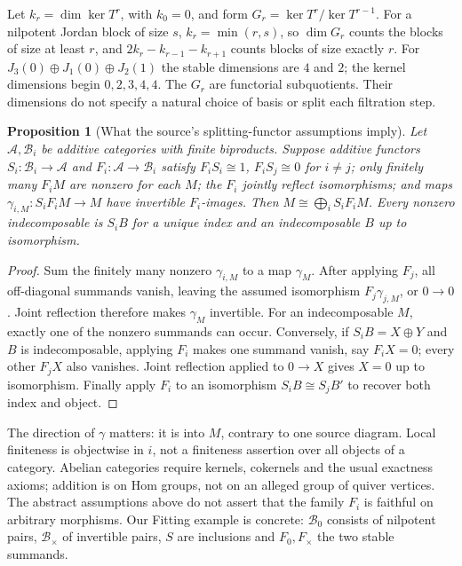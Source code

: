 \documentclass[11pt]{article}
\newtheorem{proposition}[theorem]{Proposition}
\theoremstyle{definition}\newtheorem{definition}[theorem]{Definition}
\theoremstyle{remark}\newtheorem{remark}[theorem]{Remark}
\begin{document}
Let $k_r=\dim\ker T^r$, with $k_0=0$, and form
$G_r=\ker T^r/\ker T^{r-1}$. For a nilpotent Jordan block of size $s$,
$k_r=\min(r,s)$, so $\dim G_r$ counts the blocks of size at least $r$,
and $2k_r-k_{r-1}-k_{r+1}$ counts blocks of size exactly $r$.
For $J_3(0)\oplus J_1(0)\oplus J_2(1)$ the stable dimensions are
$4$ and $2$; the kernel dimensions begin $0,2,3,4,4$.
The $G_r$ are functorial subquotients. Their dimensions do not specify a
natural choice of basis or split each filtration step.

\begin{proposition}[What the source's splitting-functor assumptions imply]
Let $\mathcal A,\mathcal B_i$ be additive categories with finite
biproducts. Suppose additive functors $S_i:\mathcal B_i\to\mathcal A$
and $F_i:\mathcal A\to\mathcal B_i$ satisfy
$F_iS_i\cong1$, $F_iS_j\cong0$ for $i\ne j$; only finitely many
$F_iM$ are nonzero for each $M$; the $F_i$ jointly reflect isomorphisms;
and maps $\gamma_{i,M}:S_iF_iM\to M$ have invertible $F_i$-images.
Then $M\cong\bigoplus_i S_iF_iM$. Every nonzero indecomposable is
$S_iB$ for a unique index and an indecomposable $B$ up to isomorphism.
\end{proposition}
\begin{proof}
Sum the finitely many nonzero $\gamma_{i,M}$ to a map $\gamma_M$.
After applying $F_j$, all off-diagonal summands vanish, leaving the
assumed isomorphism $F_j\gamma_{j,M}$, or $0\to0$. Joint reflection
therefore makes $\gamma_M$ invertible. For an indecomposable $M$, exactly
one of the nonzero summands can occur. Conversely, if $S_iB=X\oplus Y$
and $B$ is indecomposable, applying $F_i$ makes one summand vanish, say
$F_iX=0$; every other $F_jX$ also vanishes. Joint reflection applied to
$0\to X$ gives $X=0$ up to isomorphism. Finally apply $F_i$ to an
isomorphism $S_iB\cong S_jB'$ to recover both index and object.
\end{proof}
The direction of $\gamma$ matters: it is into $M$, contrary to one source
diagram. Local finiteness is objectwise in $i$, not a finiteness assertion
over all objects of a category. Abelian categories require kernels,
cokernels and the usual exactness axioms; addition is on Hom groups, not
on an alleged group of quiver vertices. The abstract assumptions above
do not assert that the family $F_i$ is faithful on arbitrary morphisms.
Our Fitting example is concrete: $\mathcal B_0$ consists of nilpotent
pairs, $\mathcal B_\times$ of invertible pairs, $S$ are inclusions and
$F_0,F_\times$ the two stable summands.
\end{document}
